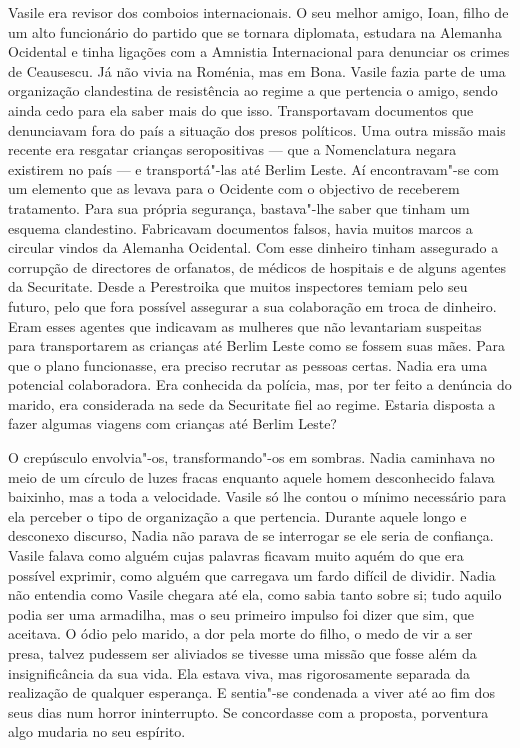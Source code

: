 Vasile era revisor dos comboios internacionais. O seu melhor amigo,
Ioan, filho de um alto funcionário do partido que se tornara
diplomata, estudara na Alemanha Ocidental e tinha ligações com a
Amnistia Internacional para denunciar os crimes de Ceausescu. Já não
vivia na Roménia, mas em Bona. Vasile fazia parte de uma organização
clandestina de resistência ao regime a que pertencia o amigo, sendo
ainda cedo para ela saber mais do que isso. Transportavam documentos que
denunciavam fora do país a situação dos presos políticos. Uma outra
missão mais recente era resgatar crianças seropositivas --- que a
Nomenclatura negara existirem no país --- e transportá"-las até Berlim
Leste. Aí encontravam"-se com um elemento que as levava para o Ocidente
com o objectivo de receberem tratamento. Para sua própria segurança,
bastava"-lhe saber que tinham um esquema clandestino. Fabricavam documentos falsos, havia muitos marcos a circular vindos da Alemanha
Ocidental. Com esse dinheiro tinham assegurado a corrupção de
directores de orfanatos, de médicos de hospitais e de alguns agentes da
Securitate. Desde a Perestroika que muitos inspectores temiam pelo seu
futuro,
pelo que fora possível assegurar a sua colaboração em troca de dinheiro.
Eram esses agentes que indicavam as mulheres que não levantariam
suspeitas para transportarem as crianças até Berlim Leste como se
fossem suas mães. Para que o plano funcionasse, era preciso recrutar as
pessoas certas. Nadia era uma potencial colaboradora. Era conhecida da
polícia, mas, por ter feito a denúncia do marido, era considerada na
sede da Securitate fiel ao regime. Estaria disposta a fazer algumas
viagens com crianças até Berlim Leste?

O crepúsculo envolvia"-os, transformando"-os em sombras. Nadia caminhava
no meio de um círculo de luzes fracas enquanto aquele homem desconhecido
falava baixinho, mas a toda a velocidade. Vasile só lhe contou o mínimo
necessário para ela perceber o tipo de organização a que pertencia.
Durante aquele longo e desconexo discurso, Nadia não parava de se
interrogar se ele seria de confiança. Vasile falava como alguém cujas
palavras ficavam muito aquém do que era possível exprimir, como alguém
que carregava um fardo difícil de dividir. Nadia não entendia como
Vasile chegara até ela, como sabia tanto sobre si; tudo aquilo podia ser
uma armadilha, mas o seu primeiro impulso foi dizer que sim, que
aceitava. O ódio pelo marido, a dor pela morte do filho, o medo de vir a
ser presa, talvez pudessem ser aliviados se tivesse uma missão que fosse
além da insignificância da sua vida. Ela estava viva, mas rigorosamente
separada da realização de qualquer esperança. E sentia"-se condenada a
viver até ao fim dos seus dias num horror ininterrupto. Se concordasse
com a proposta, porventura algo mudaria no seu espírito.



